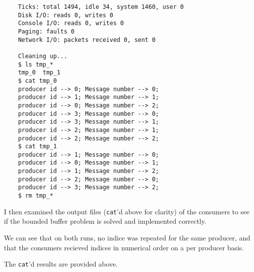 \documentclass[11pt]{article}
\begin{document}
\begin{question}
\begin{subquestion}
\begin{itemize}
{\begin{verbatim}
    Ticks: total 1494, idle 34, system 1460, user 0
    Disk I/O: reads 0, writes 0
    Console I/O: reads 0, writes 0
    Paging: faults 0
    Network I/O: packets received 0, sent 0

    Cleaning up...
    $ ls tmp_*
    tmp_0  tmp_1
    $ cat tmp_0
    producer id --> 0; Message number --> 0;
    producer id --> 1; Message number --> 1;
    producer id --> 0; Message number --> 2;
    producer id --> 3; Message number --> 0;
    producer id --> 3; Message number --> 1;
    producer id --> 2; Message number --> 1;
    producer id --> 2; Message number --> 2;
    $ cat tmp_1
    producer id --> 1; Message number --> 0;
    producer id --> 0; Message number --> 1;
    producer id --> 1; Message number --> 2;
    producer id --> 2; Message number --> 0;
    producer id --> 3; Message number --> 2;
    $ rm tmp_*
                \end{verbatim}
            }
        \end{itemize}

    \end{subquestion}
    \begin{subquestion}
        I then examined the output files ({\tt cat}'d above for clarity) of the consumers to see if the bounded buffer problem is solved and implemented correctly.

        We can see that on both runs, no indice was repeated for the same producer, and that the consumers recieved indices in numerical order on a per producer basis.
    \end{subquestion}
    \begin{subquestion}
        The {\tt cat}'d results are provided above.
    \end{subquestion}
    \end{question}
\end{document}
